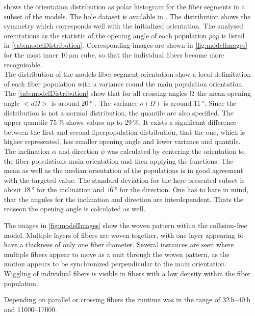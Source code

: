 % 
% 
% 
 shows the orientation distribution as polar histogram for the fiber segments in a subset of the models. 
The hole dataset is available in .
The distribution shows the symmetry which corresponds well with the initialized orientation.
The analysed oreintations as the statistic of the opening angle of each population $pop$ is listed in \cref{tab:modelDistribution}.
Corresponding images are shown in \cref{fig:modelImages} for the most inner $\SI{10}{\micro\meter}$ cube, so that the individual fibers become more recognisable.
\\
% 
The distribution of the models fiber segment orientation show a local delimitation of each fiber population with a variance round the main population orientation.
The \cref{tab:modelDistribution} show that for all crossing angles $\textnormal{$\Omega$}$ the mean opening angle $<d\Omega>$ is around $\SI{20}{\degree}$ .
The variance $\sigma(\Omega)$ is around $\SI{11}{\degree}$.
Since the distribution is not a normal distribution, the quantile are also specified.
The upper quantile $\SI{75}{\percent}$ shows values up to $\SI{29}{\percent}$.
It exists a significant difference between the first and second fiperpopulation distribution, that the one, which is higher represented, has smaller opening angle and lower variance and quantile.
\\
The inclination $\alpha$ and direction $\phi$ was calculated by centering the orientation to the fiber populations main orientation and then applying the functions.
The mean as well as the median orientation of the populations is in good agreement with the targeted value.
The standard deviation for the here presented subset is about $\SI{18}{\degree}$ for the inclination and $\SI{16}{\degree}$  for the direction. 
One has to bare in mind, that the angules for the inclination and direction are interdependent.
Thats the reaseon the opening angle is calculated as well.
\par
% 
The images in \cref{fig:modelImages} show the woven pattern within the collision-free model.
Multiple layers of fibers are woven together, with one layer appearing to have a thickness of only one fiber diameter.
Several instances are seen where multiple fibers appear to move as a unit through the woven pattern,\eg{} as the motion appears to be synchronized perpendicular to the main orientation.
Wiggling of individual fibers is visible in fibers with a low density within the fiber population.
\par
% 
Depending on parallel or crossing fibers the runtime was in the range of $\SIrange{32}{40}{\hour}$ and \SIrange{11000}{17000}{\steps}.
% 
